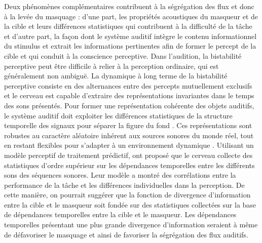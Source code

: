 Deux phénomènes complémentaires contribuent à la ségrégation des flux et donc à la levée du masquage : d'une part, les propriétés acoustiques du masqueur et de la cible et leurs différences statistiques qui contribuent à la difficulté de la tâche et d'autre part, la façon dont le système auditif intègre le contenu informationnel du stimulus et extrait les informations pertinentes afin de former le percept de la cible et qui conduit à la conscience perceptive. 
Dans l'audition, la bistabilité perceptive peut être difficile à relier à la perception ordinaire, qui est généralement non ambiguë. 
La dynamique à long terme de la bistabilité perceptive consiste en des alternances entre des percepts mutuellement exclusifs et le cerveau est capable d'extraire des représentations invariantes dans le temps des sons présentés. 
Pour former une représentation cohérente des objets auditifs, le système auditif doit exploiter les différences statistiques de la structure temporelle des signaux pour séparer la figure du fond \citep{lutfi2013information}.
Ces représentations sont robustes au caractère aléatoire inhérent aux sources sonores du monde réel, tout en restant flexibles pour s'adapter à un environnement dynamique \citep{skerritt2018detecting}. 
Utilisant un modèle perceptif de traitement prédictif, \cite{skerritt2018detecting} ont proposé que le cerveau collecte des statistiques d'ordre supérieur sur les dépendances temporelles entre les différents sons des séquences sonores. 
Leur modèle a montré des corrélations entre la performance de la tâche et les différences individuelles dans la perception. 
De cette manière, on pourrait suggérer que la fonction de divergence d'information entre la cible et le masqueur soit fondée sur des statistiques collectées sur la base de dépendances temporelles entre la cible et le masqueur. 
Les dépendances temporelles présentant une plus grande divergence d'information seraient à même de défavoriser le masquage et ainsi de favoriser la ségrégation des flux auditifs. 

